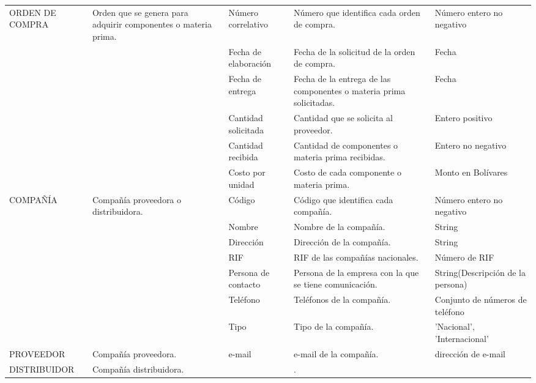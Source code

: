 \documentclass[]{report}
\begin{document}
	\begin{center}
		\begin{tabular}{ | p{2.5cm} | p{4.5cm} | p{2cm} | p{5cm} | p{3cm}|}
			\hline
			ORDEN DE COMPRA & Orden que se genera para adquirir componentes o materia prima. &
			Número correlativo & Número que identifica cada orden de compra.& Número entero no negativo\\ \cline{3-5}
			&& Fecha de elaboración & Fecha de la solicitud de la orden de compra.& Fecha\\ \cline{3-5}
			&& Fecha de entrega & Fecha de la entrega de las componentes o materia prima solicitadas.& Fecha\\ \cline{3-5}
			&& Cantidad solicitada & Cantidad que se solicita al proveedor.& Entero positivo\\ \cline{3-5}
			&& Cantidad recibida & Cantidad de componentes o materia prima recibidas.& Entero no negativo\\ \cline{3-5}
			&& Costo por unidad & Costo de cada componente o materia prima.& Monto en Bolívares\\ \cline{3-5}
			\hline
			
			COMPAÑÍA & Compañía proveedora o distribuidora. &
			Código & Código que identifica cada compañía.& Número entero no negativo\\  \cline{3-5}
			&& Nombre & Nombre de la compañía.& String\\ \cline{3-5}
			&& Dirección & Dirección de la compañía.& String\\ \cline{3-5}
			&& RIF & RIF de las compañías nacionales.& Número de RIF\\ \cline{3-5}
			&& Persona de contacto & Persona de la empresa con la que se tiene comunicación.& String(Descripción de la persona)\\ \cline{3-5}
			&& Teléfono & Teléfonos de la compañía.&Conjunto de números de teléfono\\ \cline{3-5}
			&& Tipo & Tipo de la compañía.&{'Nacional', 'Internacional'}\\ \cline{3-5}
			\hline
			
			PROVEEDOR & Compañía proveedora. & e-mail & e-mail de la compañía. & dirección de e-mail\\ \cline{3-5}
			\hline
			
			DISTRIBUIDOR & Compañía distribuidora. & & . &\\ \cline{3-5}
			\hline

			
		\end{tabular}
	\end{center}
\end{document}
